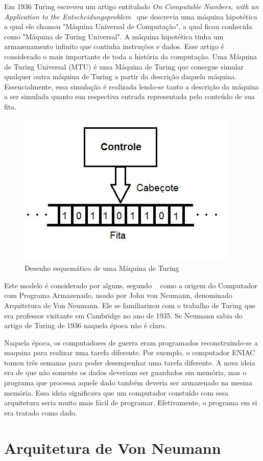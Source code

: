 \documentclass[12pt]{article}
\begin{document}
Em 1936 Turing escreveu um artigo entitulado \emph{On Computable Numbers, with an Application to the Entscheidungsproblem}~\cite{Turing1936} que descrevia uma máquina hipotética a qual ele chamou "Máquina Universal de Computação", a qual ficou conhecida como  "Máquina de Turing Universal". A máquina hipotética tinha um armazenamento infinito que continha instruções e dados. Esse artigo é considerado o mais importante de toda a história da computação. Uma Máquina de Turing Universal (MTU) é uma Máquina de Turing que consegue simular qualquer outra máquina de Turing a partir da descrição daquela máquina. Essencialmente, essa simulação é realizada lendo-se tanto a descrição da máquina a ser simulada quanto sua respectiva entrada representada pelo conteúdo de sua fita. 

\begin{figure}[!ht]
\centering
\includegraphics[width=.5\textwidth]{fig1.jpg}
\caption{Desenho esquemático de uma Máquina de Turing}
\label{fig:exampleFig1}
\end{figure}

Este modelo é considerado por alguns, segundo ~\cite{davis2001} como a origem do Computador com Programa Armazenado, usado por John von Neumann, denominado Arquitetura de Von Neumann. Ele se familiarizou com o trabalho de Turing que era professor visitante em Cambridge no ano de 1935. Se Neumann sabia do artigo de Turing de 1936 naquela época não é claro.

Naquela época, os computadores de guerra eram programados reconstruindo-se a maquina para realizar uma tarefa diferente. Por exemplo, o computador ENIAC tomou três semanas para poder desempenhar uma tarefa diferente. A nova ideia era de que não somente os dados deveriam ser guardados em memória, mas o programa que processa aquele dado também deveria ser armazenado na mesma memória. Essa ideia significava que um computador constuído com essa arquitetura seria muito mais fácil de programar. Efetivamente, o programa em si era tratado como dado.

\section{ Arquitetura de Von Neumann}
\end{document}
